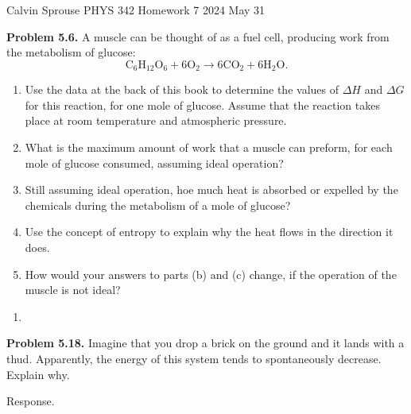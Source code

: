 \documentclass[a4paper, 12pt]{config/homework}
\begin{document}
\noindent
Calvin Sprouse \hfill PHYS 342 Homework 7 \hfill 2024 May 31
\bigskip

\bigskip\noindent
\textbf{Problem 5.6.} A muscle can be thought of as a fuel cell, producing work from the metabolism of glucose:
\[\text{C}_6\text{H}_{12}\text{O}_6 + 6\text{O}_2 \longrightarrow 6\text{CO}_2 + 6\text{H}_2\text{O}.\]
\begin{enumerate}[label=\textbf{(\alph*)}]
\item Use the data at the back of this book to determine the values of \(\Delta H\) and \(\Delta G\) for this reaction, for one mole of glucose. Assume that the reaction takes place at room temperature and atmospheric pressure.
\item What is the maximum amount of work that a muscle can preform, for each mole of glucose consumed, assuming ideal operation?
\item Still assuming ideal operation, hoe much heat is absorbed or expelled by the chemicals during the metabolism of a mole of glucose?
\item Use the concept of entropy to explain why the heat flows in the direction it does.
\item How would your answers to parts (b) and (c) change, if the operation of the muscle is not ideal?
\end{enumerate}
\begin{enumerate}[label=\textbf{(\alph*)}]
\item 
\end{enumerate}

\pagebreak\noindent
\textbf{Problem 5.18.} Imagine that you drop a brick on the ground and it lands with a thud. Apparently, the energy of this system tends to spontaneously decrease. Explain why.

\bigskip\noindent
Response.
\end{document}
